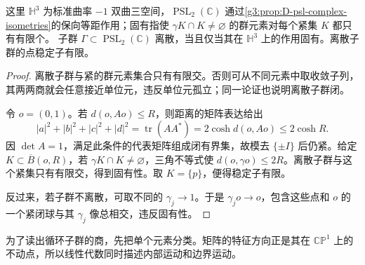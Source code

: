 \begin{proposition}\label{g3:prop:D-kleinian-proper}
	这里 \(\mathbb H^3\) 为标准曲率 \(-1\) 双曲三空间，\(\operatorname{PSL}_2(\mathbb C)\) 通过\cref{g3:prop:D-psl-complex-isometries}的保向等距作用；固有指使 \(\gamma K\cap K\ne\varnothing\) 的群元素对每个紧集 \(K\) 都只有有限个。
	子群 \(\Gamma\subset\operatorname{PSL}_2(\mathbb C)\) 离散，当且仅当其在 \(\mathbb H^3\) 上的作用固有。离散子群的点稳定子有限。
\end{proposition}
\begin{proof}
	离散子群与紧的群元素集合只有有限交。否则可从不同元素中取收敛子列，其两两商就会任意接近单位元，违反单位元孤立；同一论证也说明离散子群闭。

	令 \(o=(0,1)\)。若 \(d(o,Ao)\le R\)，则距离的矩阵表达给出
	\[
		|a|^2+|b|^2+|c|^2+|d|^2
		=\operatorname{tr}(AA^*)=2\cosh d(o,Ao)\le2\cosh R.
	\]
	因 \(\det A=1\)，满足此条件的代表矩阵组成闭有界集，故模去
	\(\{\pm I\}\) 后仍紧。给定 \(K\subset\overline B(o,R)\)，若
	\(\gamma K\cap K\ne\varnothing\)，三角不等式使
	\(d(o,\gamma o)\le2R\)。离散子群与这个紧集只有有限交，得到固有性。取 \(K=\{p\}\)，便得稳定子有限。

	反过来，若子群不离散，可取不同的 \(\gamma_j\to1\)。于是
	\(\gamma_jo\to o\)，包含这些点和 \(o\) 的一个紧闭球与其
	\(\gamma_j\) 像总相交，违反固有性。
\end{proof}

为了读出循环子群的商，先把单个元素分类。矩阵的特征方向正是其在
\(\mathbb{CP}^1\) 上的不动点，所以线性代数同时描述内部运动和边界运动。

